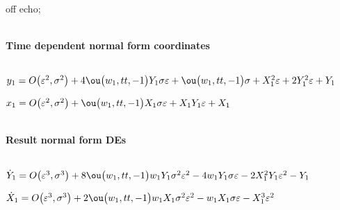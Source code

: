 \documentclass[11pt,a5paper]{article}
\begin{document}


off echo;

\(\)
\paragraph{Time dependent normal form coordinates}
\(
\)\par
\(y_{1}=O\big(\varepsilon ^{2},\sigma^{2}\big)+4 \ou\big(w_{1},tt,-1\big) 
Y_{1} \sigma  \eps+\ou\big(w_{1},tt,-1\big) \sigma +X_{1}^{2} \eps+2 Y_{
1}^{2} \eps+Y_{1}
\)\par
\(x_{1}=O\big(\varepsilon ^{2},\sigma^{2}\big)+\ou\big(w_{1},tt,-1\big) X_
{1} \sigma  \eps+X_{1} Y_{1} \eps+X_{1}
\)\par
\(\)
\paragraph{Result normal form DEs}
\(
\)\par
\(\dot Y_{1}=O\big(\varepsilon ^{3},\sigma^{3}\big)+8 \ou\big(w_{1},tt,-1
\big) w_{1} Y_{1} \sigma ^{2} \eps^{2}-4 w_{1} Y_{1} \sigma  \eps-2 X_{1
}^{2} Y_{1} \eps^{2}-Y_{1}
\)\par
\(\dot X_{1}=O\big(\varepsilon ^{3},\sigma^{3}\big)+2 \ou\big(w_{1},tt,-1
\big) w_{1} X_{1} \sigma ^{2} \eps^{2}-w_{1} X_{1} \sigma  \eps-X_{1}^{3
} \eps^{2}
\)\par
\end{document}
